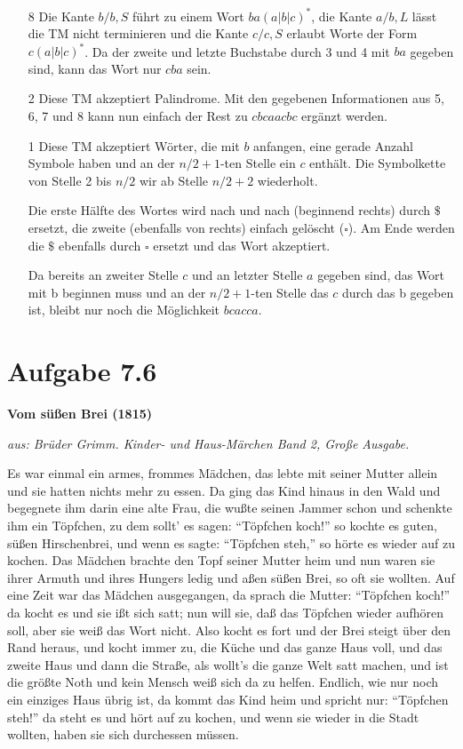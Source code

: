 \documentclass{article}
\begin{document}
\begin{enumerate}
	\item[8] Die Kante $b/b,S$ führt zu einem Wort $ba(a|b|c)^*$, die Kante $a/b,L$ lässt die TM nicht terminieren und die Kante $c/c,S$ erlaubt Worte der Form $c(a|b|c)^*$. Da der zweite und letzte Buchstabe durch 3 und 4 mit $ba$ gegeben sind, kann das Wort nur $cba$ sein.
  
	\item[2] Diese TM akzeptiert Palindrome. Mit den gegebenen Informationen aus 5, 6, 7 und 8 kann nun einfach der Rest zu $cbcaacbc$ ergänzt werden.
  
	\item[1] Diese TM akzeptiert Wörter, die mit $b$ anfangen, eine gerade Anzahl Symbole haben und an der $n/2+1$-ten Stelle ein $c$ enthält. Die Symbolkette von Stelle 2 bis $n/2$ wir ab Stelle $n/2+2$ wiederholt.
  
  Die erste Hälfte des Wortes wird nach und nach (beginnend rechts) durch $\$$ ersetzt, die zweite (ebenfalls von rechts) einfach gelöscht ($\square$). Am Ende werden die $\$$ ebenfalls durch $\square$ ersetzt und das Wort akzeptiert.
  
  
  Da bereits an zweiter Stelle $c$ und an letzter Stelle $a$ gegeben sind, das Wort mit b beginnen muss und an der $n/2+1$-ten Stelle das $c$ durch das b gegeben ist, bleibt nur noch die Möglichkeit $bcacca$.
\end{enumerate}


\section*{Aufgabe 7.6}
\begin{center}
\textbf{Vom süßen Brei (1815)}

\textit{\footnotesize{aus: Brüder Grimm. Kinder- und Haus-Märchen Band 2, Große Ausgabe.}}
\end{center}
\begin{flushleft}\small
Es war einmal ein armes, frommes Mädchen, das lebte mit seiner Mutter allein und sie hatten nichts mehr zu essen. Da ging das Kind hinaus in den Wald und begegnete ihm darin eine alte Frau, die wußte seinen Jammer schon und schenkte ihm ein Töpfchen, zu dem sollt' es sagen: "`Töpfchen koch!"' so kochte es guten, süßen Hirschenbrei, und wenn es sagte: "`Töpfchen steh,"' so hörte es wieder auf zu kochen. Das Mädchen brachte den Topf seiner Mutter heim und nun waren sie ihrer Armuth und ihres Hungers ledig und aßen süßen Brei, so oft sie wollten. Auf eine Zeit war das Mädchen ausgegangen, da sprach die Mutter: "`Töpfchen koch!"' da kocht es und sie ißt sich satt; nun will sie, daß das Töpfchen wieder aufhören soll, aber sie weiß das Wort nicht. Also kocht es fort und der Brei steigt über den Rand heraus, und kocht immer zu, die Küche und das ganze Haus voll, und das zweite Haus und dann die Straße, als wollt’s die ganze Welt satt machen, und ist die größte Noth und kein Mensch weiß sich da zu helfen. Endlich, wie nur noch ein einziges Haus übrig ist, da kommt das Kind heim und spricht nur: "`Töpfchen steh!"' da steht es und hört auf zu kochen, und wenn sie wieder in die Stadt wollten, haben sie sich durchessen müssen.
\end{flushleft}
\end{document}
